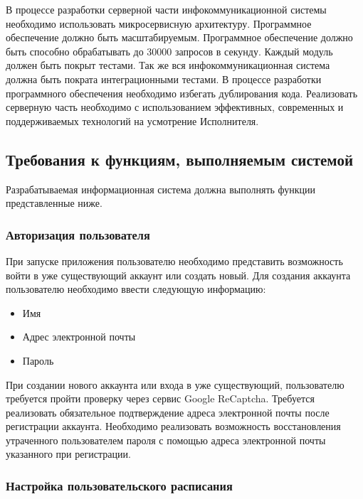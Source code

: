 \documentclass[14pt]{extreport}
\begin{document}
            В процессе разработки серверной части инфокоммуникационной системы необходимо использовать микросервисную архитектуру. Программное обеспечение должно быть масштабируемым. Программное обеспечение должно быть способно обрабатывать до 30000 запросов в секунду. Каждый модуль должен быть покрыт тестами. Так же вся инфокоммуникационная система должна быть пократа интеграционными тестами. В процессе разработки программного обеспечения необходимо избегать дублирования кода. Реализовать серверную часть необходимо с использованием эффективных, современных и поддерживаемых технологий на усмотрение Исполнителя. 

            

        \subsection{Требования к функциям, выполняемым системой}

            Разрабатываемая информационная система должна выполнять функции представленные ниже. 
            \subsubsection{Авторизация пользователя}
                При запуске приложения пользователю необходимо представить возможность войти в уже существующий аккаунт или создать новый. Для создания аккаунта пользователю необходимо ввести следующую информацию:

                \begin{itemize}
                    \item Имя 
                    \item Адрес электронной почты 
                    \item Пароль 
                \end{itemize}

                При создании нового аккаунта или входа в уже существующий, пользователю требуется пройти проверку через сервис Google ReCaptcha. Требуется реализовать обязательное подтверждение адреса электронной почты после регистрации аккаунта. Необходимо реализовать возможность восстановления утраченного пользователем пароля с помощью адреса электронной почты указанного при регистрации. 

            
            \subsubsection{Настройка пользовательского расписания}
\end{document}
